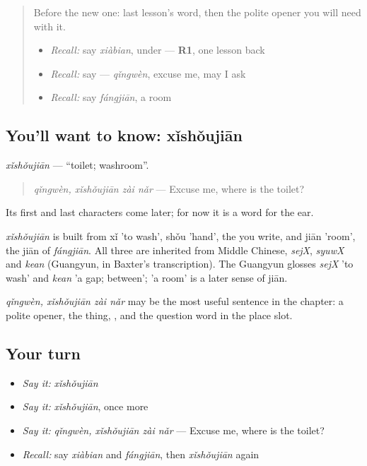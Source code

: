 \label{lesson:ZH-C86-xishoujian}



\begin{quote}
Before the new one: last lesson's word, then the polite opener you will need with it.

\begin{itemize}
\raggedright
  \item \emph{Recall:} say \emph{xiàbian}, under — \textbf{R1}, one lesson back
  \item \emph{Recall:} say  — \emph{qǐngwèn}, excuse me, may I ask
  \item \emph{Recall:} say \emph{fángjiān}, a room
\end{itemize}
\end{quote}

\subsection*{You'll want to know: xǐshǒujiān}
\emph{xǐshǒujiān} — \textquotedblleft{}toilet; washroom\textquotedblright{}.

\begin{quote}
\emph{qǐngwèn, xǐshǒujiān zài nǎr} — Excuse me, where is the toilet?
\end{quote}

Its first and last characters come later; for now it is a word for the ear.

\begin{cousinweb}
\emph{xǐshǒujiān} is built from xǐ 'to wash', shǒu 'hand', the  you write, and jiān 'room', the jiān of \emph{fángjiān}. All three are inherited from Middle Chinese, \emph{sejX}, \emph{syuwX} and \emph{kean} (Guangyun, in Baxter's transcription). The Guangyun glosses \emph{sejX} 'to wash' and \emph{kean} 'a gap; between'; 'a room' is a later sense of jiān.
\end{cousinweb}

\begin{grammarlens}[title={What you've built}]
\emph{qǐngwèn, xǐshǒujiān zài nǎr} may be the most useful sentence in the chapter: a polite opener, the thing, , and the question word in the place slot.
\end{grammarlens}

\subsection*{Your turn}
\begin{itemize}
\raggedright
  \item \emph{Say it:} \emph{xǐshǒujiān}
  \item \emph{Say it:} \emph{xǐshǒujiān}, once more
  \item \emph{Say it:} \emph{qǐngwèn, xǐshǒujiān zài nǎr} — Excuse me, where is the toilet?
  \item \emph{Recall:} say \emph{xiàbian} and \emph{fángjiān}, then \emph{xǐshǒujiān} again
\end{itemize}

